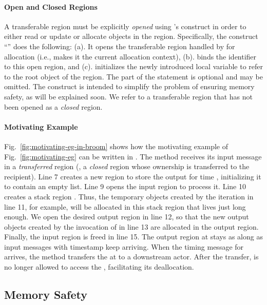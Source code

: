 \paragraph{Open and Closed Regions} A transferable region must be
explicitly \emph{opened} using \name's  construct in order to
either read or update or allocate objects in the region.
Specifically, the construct ``'' does the
following: (a). It opens the transferable region handled by 
for allocation (i.e., makes it the current allocation context), (b).
binds the identifier  to this open region, and (c). initializes
the newly introduced local variable  to refer to the root object
of the region.  The  part of the statement is optional and may
be omitted.  The  construct is intended to simplify the
problem of ensuring memory safety, as will be explained soon.  We
refer to a transferable region that has not been opened as a
\emph{closed} region.

\paragraph{Motivating Example}
Fig.~\ref{fig:motivating-eg-in-broom} shows how the motivating example
of Fig.~\ref{fig:motivating-eg} can be written in \name.  The
 method receives its input message in a
\emph{transferred} region (\ie, a \emph{closed} region whose ownership
is transferred to the recipient).  Line 7 creates a new region to
store the output for time , initializing it to contain an empty
list.  Line 9 opens the input region to process it.  Line 10 creates a
stack region .  Thus, the temporary objects created by the
iteration in line 11, for example, will be allocated in this stack
region that lives just long enough.  We open the desired output region
in line 12, so that the new output objects created by the invocation
of  in line 13 are allocated in the output region.
Finally, the input region is freed in line 15. The output region at
 stays as along as input messages with timestamp  keep
arriving. When the timing message for  arrives, the 
method transfers the  at  to a downstream actor.
After the transfer,  is no longer allowed to access
the , facilitating its deallocation.



\subsection{Memory Safety} \label{sec:memory-safety}

